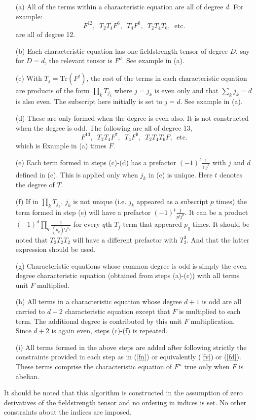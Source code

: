 \documentclass[a4paper,twocolumn]{article}
\begin{document}
\begin{enumerate}
\item[(a)] All of the terms within a characteristic equation are all of degree
$d$. For example:
\begin{equation}
    F^{12},\,\,\,T_2T_4F^6,\,\,\,T_4F^8,\,\,\,T_2T_4T_6,\,\,\,\mbox{etc.}
\end{equation}
are all of degree 12.
\item[(b)] Each characteristic equation has one fieldstrength tensor of
degree $D$, say for $D=d$, the relevant tensor is $F^d$. See
example in (a).
\item[(c)]  With $T_{j}=\mbox{Tr}(F^j)$, the rest
of the terms in each characteristic equation are products of the
form $\prod_kT_{j_k}$ where $j=j_k$ is even only and that $\sum_k
j_k =d$ is also even. The subscript here initially is set to
$j=d$. See example in (a).
\item[(d)] These are only formed when the
degree is even also. It is not constructed when the degree is odd.
The following are all of degree 13,
\begin{equation}
    F^{13},\,\,\,T_2T_4F^7,\,\,\,T_4F^9,\,\,\,T_2T_4T_6F,\,\,\,\mbox{etc.}
\end{equation}
which is Example in (a) times $F$.
\item[(e)] Each term formed in steps (c)-(d) has a prefactor
$(-1)^t\frac{1}{1!j^1}$ with $j$ and $d$ defined in (c). This is
applied only when $j_k$ in (c) is unique. Here $t$ denotes the
degree of $T$.
\item[(f)] If in $\prod_kT_{j_k}$, $j_{k}$ is not unique (i.e.
$j_{k}$ appeared as a subscript $p$ times) the term formed in step
(e) will have a prefactor $(-1)^t\frac{1}{p!j^p}$. It can be a
product $(-1)^d\prod_{q}\frac{1}{(p_q)!j^{p_q}}$ for every $q$th
$T_j$ term that appeared $p_q$ times. It should be noted that
$T_2T_2T_2$ will have a different prefactor with $T^3_2$. And that
the latter expression should be used.
\item[(g)]
Characteristic equations whose common degree is odd is simply the
even degree characteristic equation (obtained from steps (a)-(c))
with all terms unit $F$ multiplied.
\item[(h)] All terms in a characteristic equation whose degree $d+1$ is odd
are all carried to $d+2$ characteristic equation except that $F$
is multiplied to each term. The additional degree is contributed
by this unit $F$ multiplication. Since $d+2$ is again even, steps
(c)-(f) is repeated.
\item[(i)] All terms formed in the above steps are added after following
strictly the constraints provided in each step as in (\ref{fn}) or
equivalently (\ref{fv}) or (\ref{fd}). These terms comprise the
characteristic equation of $F^n$ true only when $F$ is abelian.
\end{enumerate}
It should be noted that this algorithm is constructed in the
assumption of zero derivatives of the fieldstrength tensor and no
ordering in indices is set. No other constraints about the indices
are imposed.
\end{document}
